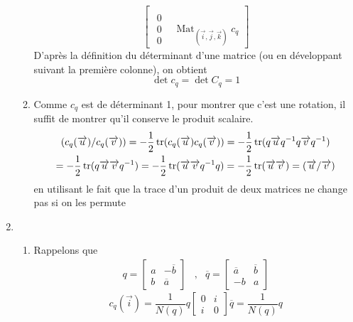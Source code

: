 \begin{enumerate}
\begin{enumerate}
\begin{displaymath}
\begin{bmatrix}
\\
\begin{matrix}
 0 \\
 0 \\
 0
\end{matrix}
  & \mathop{\mathrm{Mat}}_{(\overrightarrow i,\overrightarrow j,\overrightarrow k)} c_q
 \end{bmatrix}
\end{displaymath}
D'après la définition du déterminant d'une matrice (ou en développant suivant la première colonne), on obtient
\begin{displaymath}
 \det c_q = \det C_q =1
\end{displaymath}
\item Comme $c_q$ est de déterminant 1, pour montrer que c'est une rotation, il suffit de montrer qu'il conserve le produit scalaire.
\begin{multline*}
 (c_q(\overrightarrow u)/c_q(\overrightarrow v)) = -\dfrac{1}{2} \operatorname{tr} (c_q(\overrightarrow u)c_q(\overrightarrow v))
= -\dfrac{1}{2} \operatorname{tr} (q \overrightarrow u q^{-1} q \overrightarrow v q^{-1}) \\
= -\dfrac{1}{2} \operatorname{tr} (q \overrightarrow u \overrightarrow v q^{-1}) 
= -\dfrac{1}{2} \operatorname{tr} (\overrightarrow u \overrightarrow v q^{-1} q) 
= -\dfrac{1}{2} \operatorname{tr} (\overrightarrow u \overrightarrow v )
= (\overrightarrow u / \overrightarrow v)
\end{multline*}
en utilisant le fait que la trace d'un produit de deux matrices ne change pas si on les permute 
\end{enumerate}
\item \begin{enumerate}
 \item Rappelons que
\begin{align*}
 q = \begin{bmatrix}
 a & -\overline{b} \\
 b & \overline{a}
     \end{bmatrix}
&,&
\overline{q} = \begin{bmatrix}
\overline{a}  & \overline{b} \\
 -b & a
\end{bmatrix}
\end{align*}
\begin{displaymath}
c_q(\overrightarrow i) = \dfrac{1}{N(q)} q 
\begin{bmatrix}
 0 & i \\
 i & 0
\end{bmatrix}
\overline{q}
= \dfrac{1}{N(q)} q 

\end{displaymath}
\end{enumerate}
\end{enumerate}
